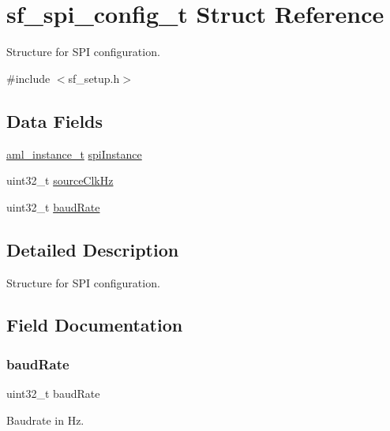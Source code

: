 \hypertarget{structsf__spi__config__t}{}\section{sf\+\_\+spi\+\_\+config\+\_\+t Struct Reference}
\label{structsf__spi__config__t}


Structure for S\+PI configuration.  




{\ttfamily \#include $<$sf\+\_\+setup.\+h$>$}

\subsection*{Data Fields}
\begin{DoxyCompactItemize}
\item 
\mbox{\hyperlink{common__aml_8h_a562bd37c7d07adcedec5993bc0cd96e5}{aml\+\_\+instance\+\_\+t}} \mbox{\hyperlink{structsf__spi__config__t_abe234e3e56ed07590f4377320714a7d4}{spi\+Instance}}
\item 
uint32\+\_\+t \mbox{\hyperlink{structsf__spi__config__t_ac83aea11badb20dd2844adf51262c9d0}{source\+Clk\+Hz}}
\item 
uint32\+\_\+t \mbox{\hyperlink{structsf__spi__config__t_ab38a80feace530cdca66134f6e3801aa}{baud\+Rate}}
\end{DoxyCompactItemize}


\subsection{Detailed Description}
Structure for S\+PI configuration. 

\subsection{Field Documentation}
\mbox{\label{structsf__spi__config__t_ab38a80feace530cdca66134f6e3801aa}} 
\subsubsection{\texorpdfstring{baudRate}{baudRate}}
{\footnotesize\ttfamily uint32\+\_\+t baud\+Rate}

Baudrate in Hz. \mbox{\label{structsf__spi__config__t_ac83aea11badb20dd2844adf51262c9d0}} 
